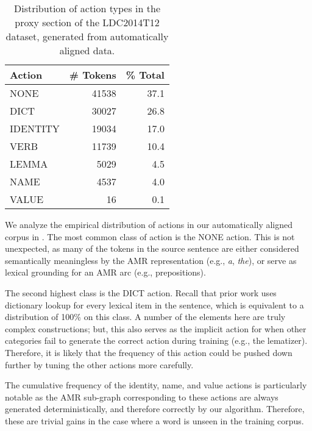 \documentclass[11pt]{article}
\newcommand\w[1]{\textit{#1}} %
\begin{document}
\begin{table}[h]
\begin{center}
\begin{tabular}{l|rr}
\bf Action & \bf \# Tokens & \bf \% Total \\ \hline
NONE & 41538 & 37.1\\
DICT & 30027 & 26.8 \\
IDENTITY & 19034 & 17.0 \\
VERB & 11739 & 10.4 \\
LEMMA & 5029 & 4.5 \\
NAME & 4537 & 4.0 \\
VALUE & 16  & 0.1\\
\end{tabular}
\end{center}
\caption{\label{tab:distro} Distribution of action types in the proxy section of the LDC2014T12 dataset, generated from automatically aligned data. }
\end{table}

We analyze the empirical distribution of actions in our automatically 
  aligned corpus in .
The most common class of action is the NONE action.
This is not unexpected, as many of the tokens in the source sentence are either
  considered semantically meaningless by the AMR representation (e.g.,
  \w{a}, \w{the}), or serve as lexical grounding for an AMR arc (e.g.,
  prepositions).

The second highest class is the DICT action.
Recall that prior work uses dictionary lookup for every lexical item in the
  sentence, which is equivalent to a distribution of 100\% on this class.
A number of the elements here are truly complex constructions; but, this also
  serves as the implicit action for when other categories fail to generate the
  correct action during training (e.g., the lematizer).
Therefore, it is likely that the frequency of this action could be pushed down
  further by tuning the other actions more carefully.

The cumulative frequency of the identity, name, and value actions is particularly 
  notable as the AMR sub-graph corresponding to these actions are
  always generated deterministically, and therefore correctly by our algorithm.
Therefore, these are trivial gains in the case where a word is unseen in the
  training corpus.

\end{document}
